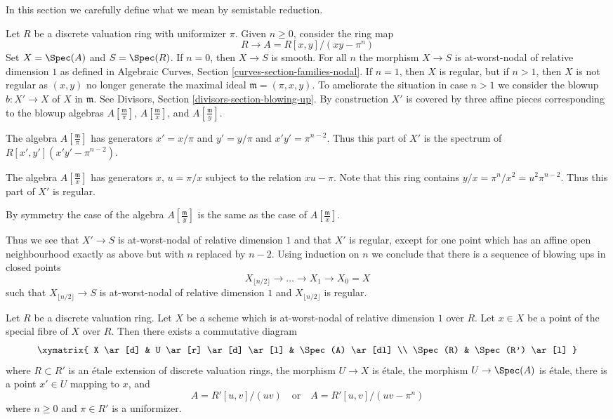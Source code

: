 \noindent
In this section we carefully define what we mean by semistable reduction.

\begin{example}
\label{example-blowup}
Let $R$ be a discrete valuation ring with uniformizer $\pi$.
Given $n \geq 0$, consider the ring map
$$
R \longrightarrow A = R[x, y]/(xy - \pi^n)
$$
Set $X = \Spec(A)$ and $S = \Spec(R)$.
If $n = 0$, then $X \to S$ is smooth.
For all $n$ the morphism $X \to S$ is at-worst-nodal
of relative dimension $1$ as defined in
Algebraic Curves, Section \ref{curves-section-families-nodal}.
If $n = 1$, then $X$ is regular, but if $n > 1$, then $X$ is not
regular as $(x, y)$ no longer generate the maximal ideal
$\mathfrak m = (\pi, x, y)$. To ameliorate the situation
in case $n > 1$ we
consider the blowup $b : X' \to X$ of $X$ in $\mathfrak m$.
See Divisors, Section \ref{divisors-section-blowing-up}.
By construction $X'$ is covered by three affine pieces
corresponding to the blowup algebras $A[\frac{\mathfrak m}{\pi}]$,
$A[\frac{\mathfrak m}{x}]$, and $A[\frac{\mathfrak m}{y}]$.

\medskip\noindent
The algebra $A[\frac{\mathfrak m}{\pi}]$ has generators
$x' = x/\pi$ and $y' = y/\pi$ and $x'y' = \pi^{n - 2}$.
Thus this part of $X'$ is the spectrum of $R[x', y'](x'y' - \pi^{n - 2})$.

\medskip\noindent
The algebra $A[\frac{\mathfrak m}{x}]$ has generators $x$,
$u = \pi/x$ subject to the relation $xu - \pi$. Note that this ring
contains $y/x = \pi^n/x^2 = u^2\pi^{n - 2}$. Thus this part of
$X'$ is regular.

\medskip\noindent
By symmetry the case of the algebra $A[\frac{\mathfrak m}{y}]$ is
the same as the case of $A[\frac{\mathfrak m}{x}]$.

\medskip\noindent
Thus we see that $X' \to S$ is at-worst-nodal of relative dimension $1$
and that $X'$ is regular, except for one point which has an
affine open neighbourhood exactly as above but with $n$ replaced by $n - 2$.
Using induction on $n$ we conclude that there is a sequence of
blowing ups in closed points
$$
X_{\lfloor n/2 \rfloor} \to \ldots \to X_1 \to X_0 = X
$$
such that $X_{\lfloor n/2 \rfloor} \to S$ is
at-worst-nodal of relative dimension $1$ and
$X_{\lfloor n/2 \rfloor}$ is regular.
\end{example}

\begin{lemma}
\label{lemma-etale-local-at-worst-nodal}
Let $R$ be a discrete valuation ring. Let $X$ be a scheme which is
at-worst-nodal of relative dimension $1$ over $R$.
Let $x \in X$ be a point of the special fibre
of $X$ over $R$. Then there exists a commutative diagram
$$
\xymatrix{
X \ar[d] &
U \ar[r] \ar[d] \ar[l] &
\Spec(A) \ar[dl] \\
\Spec(R) &
\Spec(R') \ar[l]
}
$$
where $R \subset R'$ is an \'etale extension of discrete valuation rings,
the morphism $U \to X$ is \'etale, the morphism $U \to \Spec(A)$ is \'etale,
there is a point $x' \in U$ mapping to $x$, and
$$
A = R'[u, v]/(uv)
\quad\text{or}\quad
A = R'[u, v]/(uv - \pi^n)
$$
where $n \geq 0$ and $\pi \in R'$ is a uniformizer.
\end{lemma}


